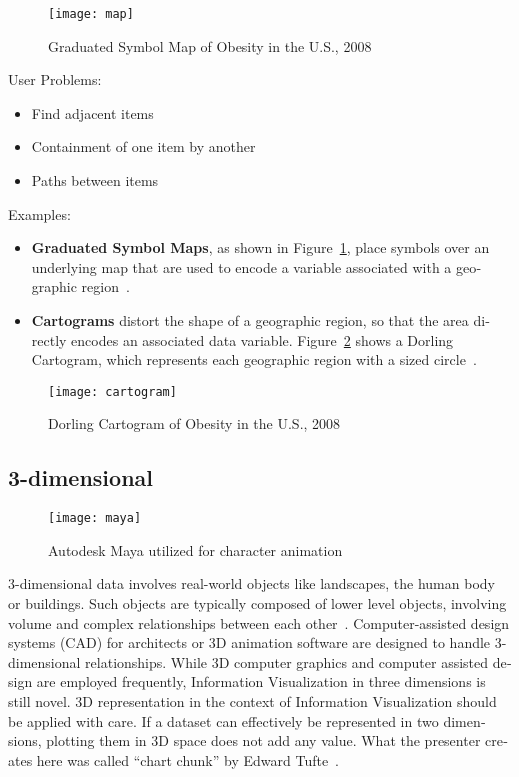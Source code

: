 \begin{english}
\begin{figure}
\centering
\texttt{[image: map]}
\caption{Graduated Symbol Map of Obesity in the U.S., 2008}
\label{fig:map}
\end{figure}

\pagebreak
\SuperPar User Problems:

\begin{itemize}
\item Find adjacent items
\item Containment of one item by another
\item Paths between items
\end{itemize}

\SuperPar Examples:

\begin{itemize}
\item \textbf{Graduated Symbol Maps}, as shown in Figure~\ref{fig:map}, place symbols over an underlying map that are used to encode a variable associated with a geographic region~\cite{VisualizationZoo:2010}.
\item \textbf{Cartograms} distort the shape of a geographic region, so that the area directly encodes an associated data variable. Figure~\ref{fig:cartogram} shows a Dorling Cartogram, which represents each geographic region with a sized circle~\cite{Dorling96,VisualizationZoo:2010}.
\end{itemize}

\begin{figure}
\centering
\texttt{[image: cartogram]}
\caption{Dorling Cartogram of Obesity in the U.S., 2008}
\label{fig:cartogram}
\end{figure}



\subsection{3-dimensional}

\begin{figure}
\centering
\texttt{[image: maya]}
\caption{Autodesk Maya utilized for character animation}
\label{fig:maya}
\end{figure}

3-dimensional data involves real-world objects like landscapes, the human body or buildings. Such objects are typically composed of lower level objects, involving volume and complex relationships between each other~\cite{shneiderman96eyes}. Computer-assisted design systems (CAD) for architects or 3D animation software are designed to handle 3-dimensional relationships. While 3D computer graphics and computer assisted design are employed frequently, Information Visualization in three dimensions is still novel. 3D representation in the context of Information Visualization should be applied with care. If a dataset can effectively be represented in two dimensions, plotting them in 3D space does not add any value. What the presenter creates here was called ``chart chunk'' by Edward Tufte~\cite{tufte09}.



\end{english}
